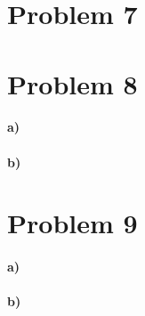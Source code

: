 \documentclass[12pt]{article}
\begin{document}
\section*{Problem 7}

\section*{Problem 8}

\paragraph{a)}

\paragraph{b)}

\section*{Problem 9}

\paragraph{a)}

\paragraph{b)}
\end{document}
